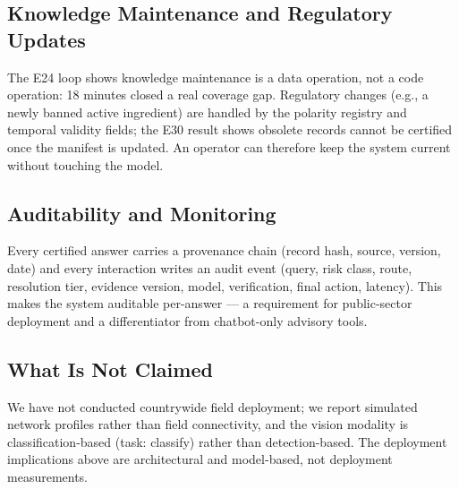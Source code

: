 \subsection{Knowledge Maintenance and Regulatory Updates}
The E24 loop shows knowledge maintenance is a data operation, not a code operation: 18 minutes closed a real coverage gap. Regulatory changes (e.g., a newly banned active ingredient) are handled by the polarity registry and temporal validity fields; the E30 result shows obsolete records cannot be certified once the manifest is updated. An operator can therefore keep the system current without touching the model.

\subsection{Auditability and Monitoring}
Every certified answer carries a provenance chain (record hash, source, version, date) and every interaction writes an audit event (query, risk class, route, resolution tier, evidence version, model, verification, final action, latency). This makes the system auditable per-answer --- a requirement for public-sector deployment and a differentiator from chatbot-only advisory tools.

\subsection{What Is Not Claimed}
We have not conducted countrywide field deployment; we report simulated network profiles rather than field connectivity, and the vision modality is classification-based (task: classify) rather than detection-based. The deployment implications above are architectural and model-based, not deployment measurements.